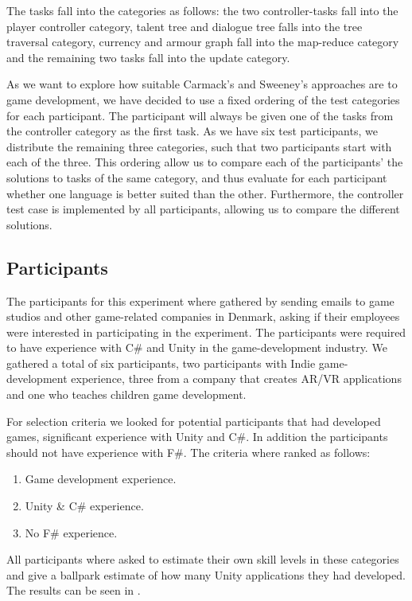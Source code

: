 The tasks fall into the categories as follows: the two controller-tasks fall into the player controller category, talent tree and dialogue tree falls into the tree traversal category, currency and armour graph fall into the map-reduce category and the remaining two tasks fall into the  update category.

As we want to explore how suitable Carmack's and Sweeney's approaches are to game development, we have decided to use a fixed ordering of the test categories for each participant. The participant will always be given one of the tasks from the controller category as the first task. As we have six test participants, we distribute the remaining three categories, such that two participants start with each of the three. This ordering allow us to compare each of the participants' the solutions to tasks of the same category, and thus evaluate for each participant whether one language is better suited than the other. Furthermore, the controller test case is implemented by all participants, allowing us to compare the different solutions.

\subsection{Participants}
The participants for this experiment where gathered by sending emails to game studios and other game-related companies in Denmark, asking if their employees were interested in participating in the experiment. The participants were required to have experience with C\# and Unity in the game-development industry. We gathered a total of six participants, two participants with Indie game-development experience, three from a company that creates \gls{AR}/\gls{VR} applications and one who teaches children game development.

For selection criteria we looked for potential participants that had developed games, significant experience with Unity and C\#. In addition the participants should not have experience with F\#. The criteria where ranked as follows:
\begin{enumerate}
	\item Game development experience.
	\item Unity \& C\# experience.
	\item No F\# experience.
\end{enumerate}

All participants where asked to estimate their own skill levels in these categories and give a ballpark estimate of how many Unity applications they had developed. The results can be seen in .

